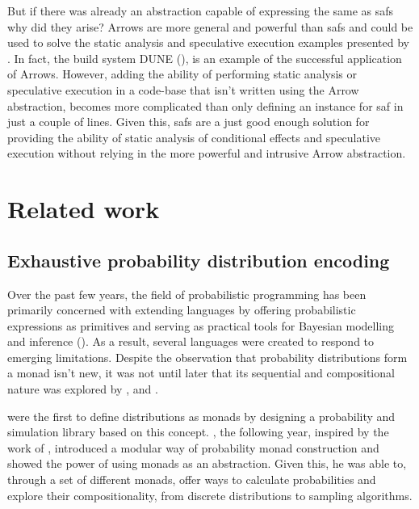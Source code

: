 \documentclass[
  oneside,
  11pt, a4paper,
  footinclude=true,
  headinclude=true,
  cleardoublepage=empty
]{scrbook}
\theoremstyle{definition}
\theoremstyle{definition}
\begin{document}
	            But if there was already an abstraction capable of expressing the same as \glspl{saf} why did they arise? Arrows are more general and powerful than \glspl{saf} and could be used to solve the static analysis and speculative execution examples presented by \cite{andrey2019selective}. In fact, the build system DUNE (\cite{dune_2018}), is an example of the successful application of Arrows. However, adding the ability of performing static analysis or speculative execution in a code-base that isn't written using the Arrow abstraction, becomes more complicated than only defining an instance for \gls{saf} in just a couple of lines. Given this, \glspl{saf} are a just good enough solution for providing the ability of static analysis of conditional effects and speculative execution without relying in the more powerful and intrusive Arrow abstraction.
	            
	    \section{Related work}\label{sec-related-work}
        
        \subsection{Exhaustive probability distribution encoding}
        
        Over the past few years, the field of probabilistic programming has been primarily concerned with extending languages by offering probabilistic expressions as primitives and serving as practical tools for Bayesian modelling and inference (\cite{erwig_kollmansberger_2006}). As a result, several languages were created to respond to emerging limitations. Despite the observation that probability distributions form a monad isn't new, it was not until later that its sequential and compositional nature was explored by \cite{Ramsey:2002:SLC:565816.503288}, \cite{Goodman:2013:PPP:2480359.2429117} and \cite{Gordon:2013:MPB:2429069.2429119}.
        
        \cite {erwig_kollmansberger_2006} were the first to define distributions as monads by designing a probability and simulation library based on this concept. \cite{kidd2007build}, the following year, inspired by the work of \cite{Ramsey:2002:SLC:565816.503288}, introduced a modular way of probability monad construction and showed the power of using monads as an abstraction. Given this, he was able to, through a set of different monads, offer ways to calculate probabilities and explore their compositionality, from discrete distributions to sampling algorithms.
                
\end{document}
